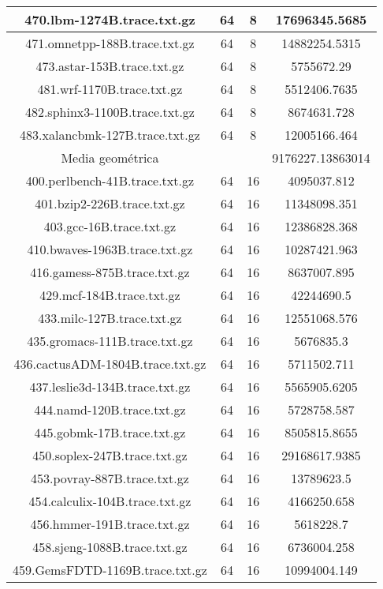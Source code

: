 \begin{table}[H]
\begin{center}
{\begin{tabular}{|c|c|c|c|}
		\hline
		470.lbm-1274B.trace.txt.gz	&	64	&	8	&	17696345.5685	\\
		\hline
		471.omnetpp-188B.trace.txt.gz	&	64	&	8	&	14882254.5315	\\
		\hline
		473.astar-153B.trace.txt.gz	&	64	&	8	&	5755672.29	\\
		\hline
		481.wrf-1170B.trace.txt.gz	&	64	&	8	&	5512406.7635	\\
		\hline
		482.sphinx3-1100B.trace.txt.gz	&	64	&	8	&	8674631.728	\\
		\hline
		483.xalancbmk-127B.trace.txt.gz	&	64	&	8	&	12005166.464	\\
		\hline
		\hline
		Media	geométrica	&		&	&	9176227.13863014	\\
		\hline
		400.perlbench-41B.trace.txt.gz	&	64	&	16	&	4095037.812	\\
		\hline
		401.bzip2-226B.trace.txt.gz	&	64	&	16	&	11348098.351	\\
		\hline
		403.gcc-16B.trace.txt.gz	&	64	&	16	&	12386828.368	\\
		\hline
		410.bwaves-1963B.trace.txt.gz	&	64	&	16	&	10287421.963	\\
		\hline
		416.gamess-875B.trace.txt.gz	&	64	&	16	&	8637007.895	\\
		\hline
		429.mcf-184B.trace.txt.gz	&	64	&	16	&	42244690.5	\\
		\hline
		433.milc-127B.trace.txt.gz	&	64	&	16	&	12551068.576	\\
		\hline
		435.gromacs-111B.trace.txt.gz	&	64	&	16	&	5676835.3	\\
		\hline
		436.cactusADM-1804B.trace.txt.gz	&	64	&	16	&	5711502.711	\\
		\hline
		437.leslie3d-134B.trace.txt.gz	&	64	&	16	&	5565905.6205	\\
		\hline
		444.namd-120B.trace.txt.gz	&	64	&	16	&	5728758.587	\\
		\hline
		445.gobmk-17B.trace.txt.gz	&	64	&	16	&	8505815.8655	\\
		\hline
		450.soplex-247B.trace.txt.gz	&	64	&	16	&	29168617.9385	\\
		\hline
		453.povray-887B.trace.txt.gz	&	64	&	16	&	13789623.5	\\
		\hline
		454.calculix-104B.trace.txt.gz	&	64	&	16	&	4166250.658	\\
		\hline
		456.hmmer-191B.trace.txt.gz	&	64	&	16	&	5618228.7	\\
		\hline
		458.sjeng-1088B.trace.txt.gz	&	64	&	16	&	6736004.258	\\
		\hline
		459.GemsFDTD-1169B.trace.txt.gz	&	64	&	16	&	10994004.149	\\

\end{tabular}}
\end{center}
\end{table}
